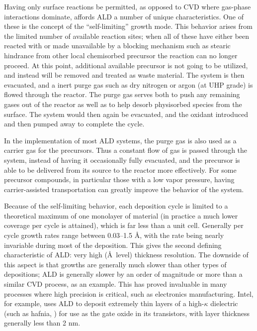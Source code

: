 Having only surface reactions be permitted, as opposed to CVD where gas-phase interactions dominate, affords ALD a number of unique characteristics. One of these is the concept of the ``self-limiting'' growth mode. This behavior arises from the limited number of available reaction sites; when all of these have either been reacted with or made unavailable by a blocking mechanism such as stearic hindrance from other local chemisorbed precursor the reaction can no longer proceed. At this point, additional available precursor is not going to be utilized, and instead will be removed and treated as waste material. The system is then evacuated, and a inert purge gas such as dry nitrogen or argon (at UHP grade) is flowed through the reactor. The purge gas serves both to push any remaining gases out of the reactor as well as to help desorb physisorbed species from the surface.  The system would then again be evacuated, and the oxidant introduced and then pumped away to complete the cycle. 

In the implementation of most ALD systems, the purge gas is also used as a carrier gas for the precursors. Thus a constant flow of gas is passed through the system, instead of having it occasionally fully evacuated, and the precursor is able to be delivered from its source to the reactor more effectively. For some precursor compounds, in particular those with a low vapor pressure, having carrier-assisted transportation can greatly improve the behavior of the system. 

Because of the self-limiting behavior, each deposition cycle is limited to a theoretical maximum of one monolayer of material (in practice a much lower coverage per cycle is attained), which is far less than a unit cell. Generally per cycle growth rates range between 0.03--1.5 \AA{}, with the rate being nearly invariable during most of the deposition. This gives the second defining characteristic of ALD: very high (\AA\ level) thickness resolution. The downside of this aspect is that growths are generally much slower than other types of depositions; ALD is generally slower by an order of magnitude or more than a similar CVD process, as an example. This has proved invaluable in many processes where high precision is critical, such as electronics manufacturing. Intel, for example, uses ALD to deposit extremely thin layers of a high-$\kappa$ dielectric (such as hafnia, ) for use as the gate oxide in its transistors, with layer thickness generally less than 2 nm. 

